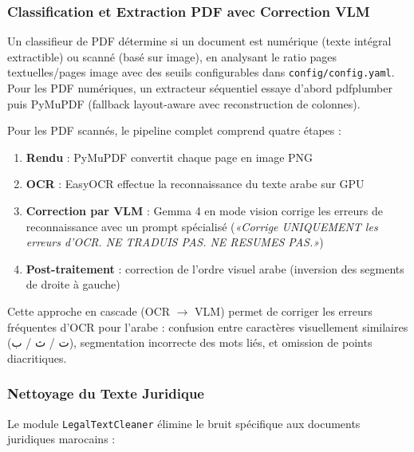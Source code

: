 \subsubsection{Classification et Extraction PDF avec Correction VLM}

Un classifieur de PDF \cite{src:pdfclassifier} détermine si un document est
numérique (texte intégral extractible) ou scanné (basé sur image), en
analysant le ratio pages textuelles/pages image avec des seuils configurables
dans \texttt{config/config.yaml}. Pour les PDF numériques, un extracteur
séquentiel essaye d'abord pdfplumber puis PyMuPDF (fallback layout-aware avec
reconstruction de colonnes).

Pour les PDF scannés, le pipeline complet comprend quatre étapes :
\begin{enumerate}
    \item \textbf{Rendu} : PyMuPDF convertit chaque page en image PNG
    \item \textbf{OCR} : EasyOCR effectue la reconnaissance du texte arabe
    sur GPU
    \item \textbf{Correction par VLM} : Gemma 4 en mode vision corrige les
    erreurs de reconnaissance avec un prompt spécialisé (\textit{«Corrige
    UNIQUEMENT les erreurs d'OCR. NE TRADUIS PAS. NE RESUMES PAS.»})
    \item \textbf{Post-traitement} : correction de l'ordre visuel arabe
    (inversion des segments de droite à gauche)
\end{enumerate}

Cette approche en cascade (OCR $\rightarrow$ VLM) permet de corriger les
erreurs fréquentes d'OCR pour l'arabe : confusion entre caractères
visuellement similaires (\textarabic{ت} / \textarabic{ث} / \textarabic{ب}),
segmentation incorrecte des mots liés, et omission de points diacritiques.

\subsubsection{Nettoyage du Texte Juridique}

Le module \texttt{LegalTextCleaner} \cite{src:cleaner} élimine le bruit
spécifique aux documents juridiques marocains :


